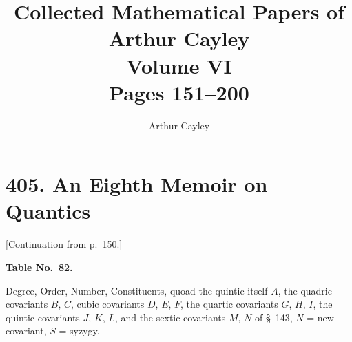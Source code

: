 \documentclass[11pt,a4paper]{article}
\title{\textbf{Collected Mathematical Papers of Arthur Cayley}\\[6pt]
\Large Volume VI\\[12pt]
\large Pages 151--200}
\author{Arthur Cayley}
\date{}
\theoremstyle{cayley}
\begin{document}
\maketitle
\thispagestyle{empty}
\vspace{2em}
\tableofcontents
\newpage

\section*{405. An Eighth Memoir on Quantics}

\vspace{1em}

[Continuation from p.~150.]
\vspace{1em}

\setcounter{art}{252}

\newpage
\noindent\textbf{Table No.~82.}\par
\vspace{0.5em}
\noindent
Degree, Order, Number, Constituents, quoad the quintic itself $A$, the quadric covariants $B$, $C$,\quad
cubic covariants $D$, $E$, $F$, the quartic covariants $G$, $H$, $I$, the quintic covariants $J$, $K$, $L$,\quad
and the sextic covariants $M$, $N$ of \S\ 143, $N$ = new covariant, $S$ = syzygy.
\vspace{0.5em}
\end{document}
